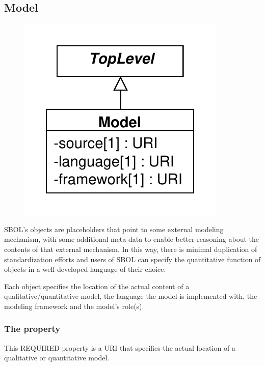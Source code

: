 
\subsection{Model}
\label{sec:Model}

\begin{figure}[ht]
\begin{center}
\includegraphics[scale=0.6]{uml/model}
\caption[]{}
\label{uml:model}
\end{center}
\end{figure}

SBOL's  objects are placeholders that point to some external modeling mechanism, with some additional meta-data to enable better reasoning about the contents of that external mechanism.
In this way, there is minimal duplication of standardization efforts and users of SBOL can specify the quantitative function of  objects in a well-developed language of their choice. 

Each  object specifies the location of the actual content of a qualitative/quantitative model, the language the model is implemented with, the modeling framework and the model's role(s). 

\subsubsection*{ The  property}
This REQUIRED property is a URI that specifies the actual location of a qualitative or quantitative model.

